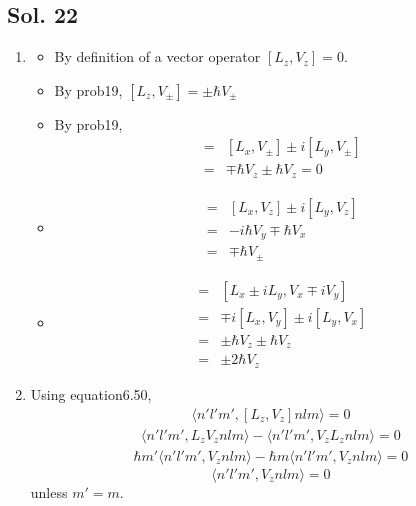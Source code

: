 \subsection*{Sol. 22}
\begin{enumerate}
    \item 
    \begin{itemize}
        \item By definition of a vector operator $[L_z, V_z]=0.$
        \item By prob19, $[L_z,V_\pm]=\pm\hbar V_\pm$
        \item  By prob19, 
        \begin{align*}
            [L_\pm, V_\pm] =& 
            [L_x, V_\pm]\pm i
            [L_y, V_\pm]\\
            =&\mp \hbar V_z
            \pm \hbar V_z = 0
        \end{align*}
        \item 
        \begin{align*}
            [L_\pm, V_z] =& 
            [L_x,V_z] \pm i[L_y, V_z]\\
            =&-i\hbar V_y\mp \hbar V_x\\
            =&\mp \hbar V_\pm
        \end{align*}
        \item 
        \begin{align*}
            [L_\pm, V_\mp]=&
            [L_x\pm iL_y, V_x\mp i V_y]\\
            =&\mp i[L_x, V_y]\pm i[L_y, V_x]\\
            =&\pm \hbar V_z\pm \hbar V_z\\
            =&\pm 2\hbar V_z
        \end{align*}
    \end{itemize}
    \item Using equation6.50,
    \begin{align*}
        \langle n'l'm', [L_z, V_z] nlm\rangle=0
    \end{align*}
    \begin{align*}
        \langle n'l'm', L_z V_znlm\rangle
        -\langle n'l'm',  V_zL_z nlm\rangle=0
    \end{align*}
    \begin{align*}
        \hbar m'\langle n'l'm', V_znlm\rangle
        -\hbar m\langle n'l'm',  V_z nlm\rangle=0
    \end{align*}
    $$
    \langle n'l'm', V_znlm\rangle = 0
    $$
    unless $m'=m.$
\end{enumerate}

